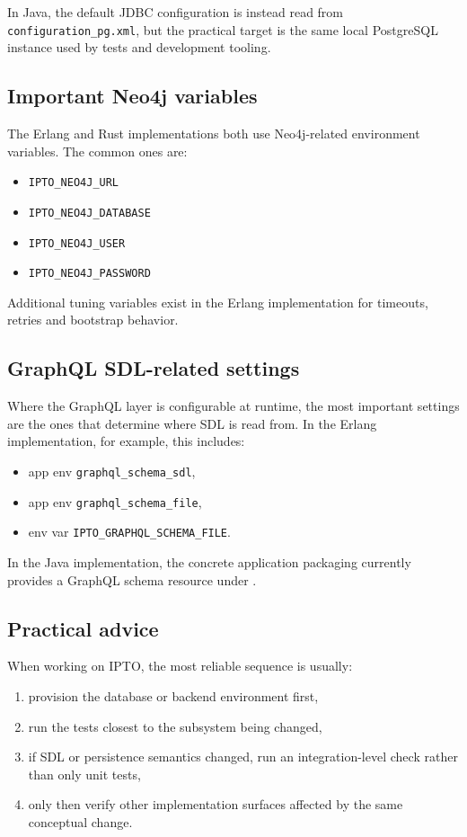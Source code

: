 In Java, the default JDBC configuration is instead read from \texttt{configuration\_pg.xml}, but the practical target is the same local PostgreSQL instance used by tests and development tooling.

\subsection{Important Neo4j variables}

The Erlang and Rust implementations both use Neo4j-related environment variables. The common ones are:
\begin{itemize}
\item \texttt{IPTO\_NEO4J\_URL}
\item \texttt{IPTO\_NEO4J\_DATABASE}
\item \texttt{IPTO\_NEO4J\_USER}
\item \texttt{IPTO\_NEO4J\_PASSWORD}
\end{itemize}

Additional tuning variables exist in the Erlang implementation for timeouts, retries and bootstrap behavior.

\subsection{GraphQL SDL-related settings}

Where the GraphQL layer is configurable at runtime, the most important settings are the ones that determine where SDL is read from. In the Erlang implementation, for example, this includes:
\begin{itemize}
\item app env \texttt{graphql\_schema\_sdl},
\item app env \texttt{graphql\_schema\_file},
\item env var \texttt{IPTO\_GRAPHQL\_SCHEMA\_FILE}.
\end{itemize}

In the Java implementation, the concrete application packaging currently provides a GraphQL schema resource under .

\subsection{Practical advice}

When working on IPTO, the most reliable sequence is usually:
\begin{enumerate}
\item provision the database or backend environment first,
\item run the tests closest to the subsystem being changed,
\item if SDL or persistence semantics changed, run an integration-level check rather than only unit tests,
\item only then verify other implementation surfaces affected by the same conceptual change.
\end{enumerate}

